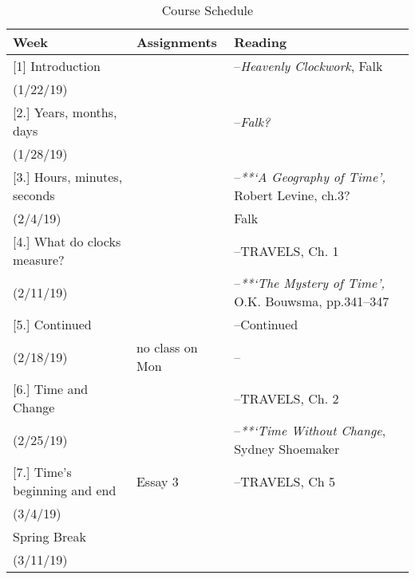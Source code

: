 \documentclass[article,oneside]{memoir}
\begin{document}
\begin{center}
\begin{longtable}{p{4.5cm}p{2cm}p{6cm}}
 
  \caption{Course Schedule} \\
  \toprule
  \textbf{Week} &\textbf{Assignments} & \textbf{Reading} \\
  \midrule


[1] Introduction		  		& 	 			& --\emph{Heavenly Clockwork}, Falk	\\
(1/22/19)					&		  		&    \\ [1.8\baselineskip]

[2.] Years, months, days		& 				& --\emph{Falk?} \\
(1/28/19)			        		&				  	&    \\  [1.8\baselineskip]

[3.] Hours, minutes, seconds   	&     		&  --\emph{**`A Geography of Time',} Robert Levine, ch.3?  \\
(2/4/19)				         &		  	    	&   Falk \\  [1.8\baselineskip]


[4.] What do clocks measure?	& 			& --TRAVELS, Ch. 1\\
(2/11/19)				        	& 			    	& --\emph{**`The Mystery of Time',} O.K. Bouwsma, pp.341--347 \\ [1.8\baselineskip]

[5.] Continued			      	& 		& --Continued \\
(2/18/19)				   & no class on Mon & -- \\ [1.8\baselineskip]

[6.] Time and Change		    	&    		& --TRAVELS, Ch. 2 \\
(2/25/19)			        		&		    	  	&  --\emph{**`Time Without Change}, Sydney Shoemaker\\ [1.8\baselineskip]


[7.] Time's beginning and end		    		& Essay 3	   		& --TRAVELS, Ch 5 \\
(3/4/19)			        		&		    	  	&  \\ [1.8\baselineskip]

Spring Break 		    		& 		  		&  \\
(3/11/19)			        		&		    	  	&  \\ [1.8\baselineskip]


\end{longtable}
\end{center}
\end{document}
